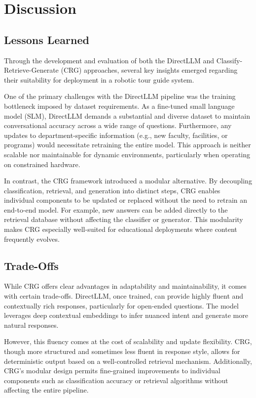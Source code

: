 \documentclass[conference]{IEEEtran}
\begin{document}
\section{Discussion}
\subsection{Lessons Learned}
Through the development and evaluation of both the DirectLLM and Classify-Retrieve-Generate (CRG) approaches, several key insights emerged regarding their suitability for deployment in a robotic tour guide system.

One of the primary challenges with the DirectLLM pipeline was the training bottleneck imposed by dataset requirements. 
As a fine-tuned small language model (SLM), DirectLLM demands a substantial and diverse dataset to maintain conversational accuracy across a wide range of questions. 
Furthermore, any updates to department-specific information (e.g., new faculty, facilities, or programs) would necessitate retraining the entire model. 
This approach is neither scalable nor maintainable for dynamic environments, particularly when operating on constrained hardware.

In contrast, the CRG framework introduced a modular alternative. 
By decoupling classification, retrieval, and generation into distinct steps, CRG enables individual components to be updated or replaced without the need to retrain an end-to-end model. 
For example, new answers can be added directly to the retrieval database without affecting the classifier or generator. 
This modularity makes CRG especially well-suited for educational deployments where content frequently evolves.

\subsection{Trade-Offs}
While CRG offers clear advantages in adaptability and maintainability, it comes with certain trade-offs. 
DirectLLM, once trained, can provide highly fluent and contextually rich responses, particularly for open-ended questions. 
The model leverages deep contextual embeddings to infer nuanced intent and generate more natural responses.

However, this fluency comes at the cost of scalability and update flexibility. 
CRG, though more structured and sometimes less fluent in response style, allows for deterministic output based on a well-controlled retrieval mechanism. 
Additionally, CRG's modular design permits fine-grained improvements to individual components such as classification accuracy or retrieval algorithms without affecting the entire pipeline.
\end{document}
